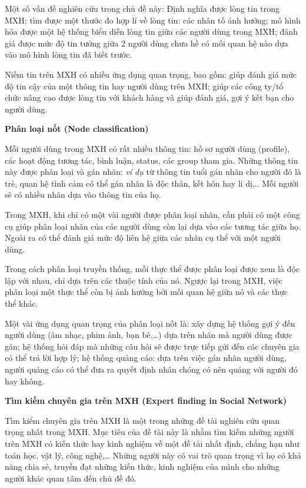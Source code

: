 \documentclass[12pt]{extarticle}
\begin{document}
			\par Một số vấn đề nghiên cứu trong chủ đề này: Định nghĩa được lòng tin trong MXH; tìm được một thước đo hợp lí về lòng tin: các nhân tố ảnh hưởng; mô hình hóa được một hệ thống biểu diễn lòng tin giữa các người dùng trong MXH; đánh giá được mức độ tin tưởng giữa 2 người dùng chưa hề có mối quan hệ nào dựa vào mô hình lòng tin đã biết trước.
			\par Niềm tin trên MXH có nhiều ứng dụng quan trọng, bao gồm: giúp đánh giá mức độ tin cậy của một thông tin hay người dùng trên MXH; giúp các công ty/tổ chức nâng cao được lòng tin với khách hàng và giúp đánh giá, gợi ý kết bạn cho người dùng.
			\par \textbf{Phân loại nốt (Node classification)}
			\par Mỗi người dùng trong MXH có rất nhiều thông tin: hồ sơ người dùng (profile), các hoạt động tương tác, bình luận, status, các group tham gia. Những thông tin này được phân loại và gán nhãn: \textit{ví dụ} từ thông tin tuổi gán nhãn cho người đó là trẻ, quan hệ tình cảm có thể gán nhãn là độc thân, kết hôn hay li dị,.. Mỗi người sẽ có nhiều nhãn dựa vào thông tin của họ.
			\par Trong MXH, khi chỉ có một vài người được phân loại nhãn, cần phải có một công cụ giúp phân loại nhãn của các người dùng còn lại dựa vào các tương tác giữa họ. Ngoài ra có thể đánh giá mức độ liên hệ giữa các nhãn cụ thể với một người dùng.
			\par Trong cách phân loại truyền thống, mỗi thực thể được phân loại được xem là độc lập với nhau, chỉ dựa trên các thuộc tính của nó. Ngược lại trong MXH, việc phân loại một thực thể còn bị ảnh hưởng bởi mối quan hệ giữa nó và các thực thể khác.
			\par Một vài ứng dụng quan trọng của phân loại nốt là: xây dựng hệ thống gợi ý đến người dùng (âm nhạc, phim ảnh, bạn bè,…) dựa trên nhãn mà người dùng được gán; hệ thống hỏi đáp mà những câu hỏi sẽ được trực tiếp gửi đến các chuyên gia có thể trả lời hợp lý; hệ thống quảng cáo: dựa trên việc gán nhãn người dùng, người quảng cáo có thể đưa ra quyết định nhân chóng có nên quảng với người đó hay không.
			\par \textbf{Tìm kiếm chuyên gia trên MXH (Expert finding in Social Network)}
			\par Tìm kiểm chuyên gia trên MXH là một trong những đề tài nghiên cứu quan trọng nhất trong MXH. Mục tiêu của đề tài này là nhằm tìm kiếm những người trên MXH có kiến thức hay kinh nghiệm về một đề tài nhất định, chẳng hạn như toán học, vật lý, công nghệ,… Những người này có vai trò quan trọng vì họ có khả năng chia sẻ, truyền đạt những kiến thức, kinh nghiệm của mình cho những người khác quan tâm đến chủ đề đó.
\end{document}
